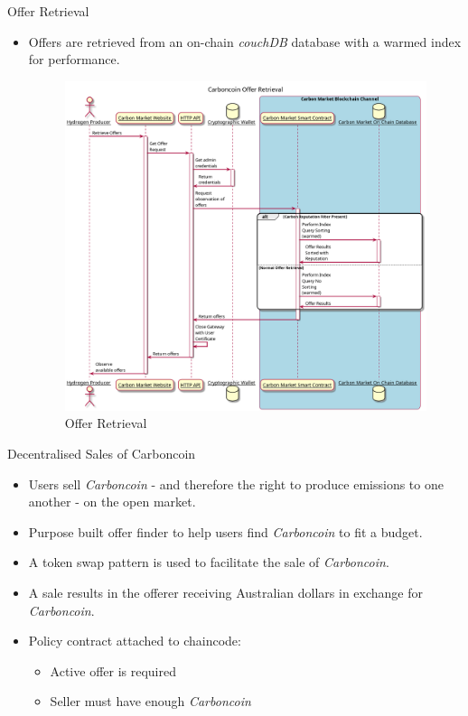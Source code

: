 \begin{frame}{Offer Retrieval}
    \begin{itemize}
        \item Offers are retrieved from an on-chain \textit{couchDB}
              database with a warmed index for performance.
              \begin{figure}
                  \caption{Offer Retrieval}
                  \centering
                  \includegraphics[height=0.5\textheight, width=0.6\textheight]
                  {figures/GetOffersNo.png}
              \end{figure}
    \end{itemize}
\end{frame}
\begin{frame}{Decentralised Sales of Carboncoin}
    \begin{itemize}
        \item Users sell \textit{Carboncoin} - and therefore the right to
              produce emissions to one another - on the open market.
        \item Purpose built offer finder to help users find \textit{Carboncoin}
              to fit a budget.
        \item A token swap pattern is used to facilitate the sale
              of \textit{Carboncoin}.
        \item A sale results in the offerer receiving Australian dollars in
              exchange for \textit{Carboncoin}.
        \item Policy contract attached to chaincode:
              \begin{itemize}
                  \item Active offer is required
                  \item Seller must have enough \textit{Carboncoin}
              \end{itemize}
    \end{itemize}
\end{frame}
